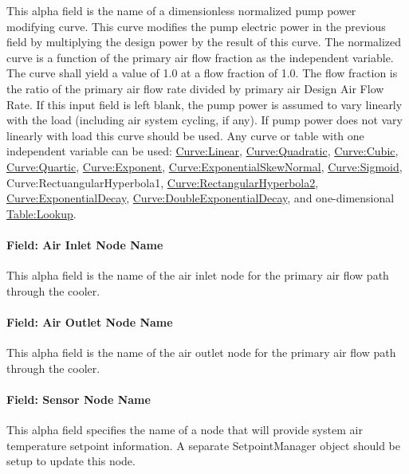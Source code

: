 This alpha field is the name of a dimensionless normalized pump power modifying curve. This curve modifies the pump electric power in the previous field by multiplying the design power by the result of this curve. The normalized curve is a function of the primary air flow fraction as the independent variable. The curve shall yield a value of 1.0 at a flow fraction of 1.0. The flow fraction is the ratio of the primary air flow rate divided by primary air Design Air Flow Rate. If this input field is left blank, the pump power is assumed to vary linearly with the load (including air system cycling, if any). If pump power does not vary linearly with load this curve should be used. Any curve or table with one independent variable can be used: \hyperref[curvelinear]{Curve:Linear}, \hyperref[curvequadratic]{Curve:Quadratic}, \hyperref[curvecubic]{Curve:Cubic}, \hyperref[curvequartic]{Curve:Quartic}, \hyperref[curveexponent]{Curve:Exponent}, \hyperref[curveexponentialskewnormal]{Curve:ExponentialSkewNormal}, \hyperref[curvesigmoid]{Curve:Sigmoid}, Curve:RectuangularHyperbola1, \hyperref[curverectangularhyperbola2]{Curve:RectangularHyperbola2}, \hyperref[curveexponentialdecay]{Curve:ExponentialDecay}, \hyperref[curvedoubleexponentialdecay]{Curve:DoubleExponentialDecay}, and one-dimensional \hyperref[tablelookup]{Table:Lookup}.

\paragraph{Field: Air Inlet Node Name}\label{field-air-inlet-node-name-1-001}

This alpha field is the name of the air inlet node for the primary air flow path through the cooler.

\paragraph{Field: Air Outlet Node Name}\label{field-air-outlet-node-name-1-000}

This alpha field is the name of the air outlet node for the primary air flow path through the cooler.

\paragraph{Field: Sensor Node Name}\label{field-sensor-node-name-001}

This alpha field specifies the name of a node that will provide system air temperature setpoint information. A separate SetpointManager object should be setup to update this node.

